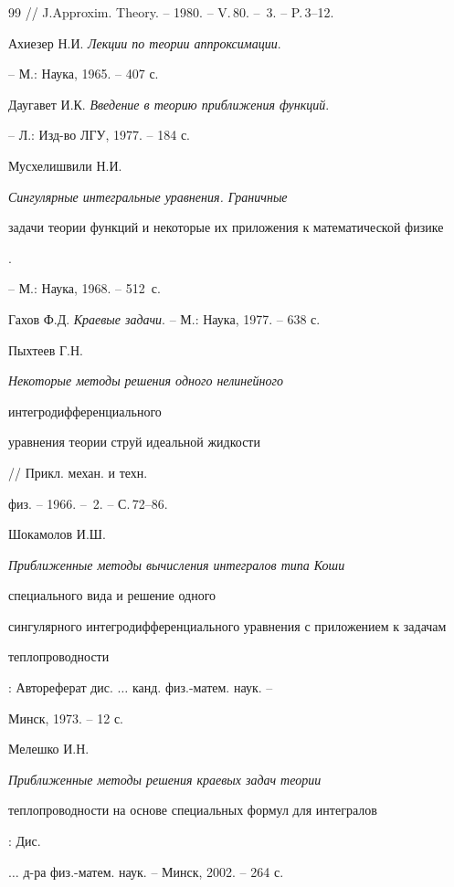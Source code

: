 \begin{thebibliography}{99}
// J.Approxim. Theory. -- 1980. -- V.\,80. -- \No\,3. -- P.\,3--12.







Ахиезер Н.И. {\em Лекции по теории аппроксимации}.


-- М.: Наука, 1965. -- 407 с.







Даугавет И.К. {\em Введение в теорию приближения функций}.


-- Л.: Изд-во ЛГУ, 1977. -- 184 с.







Мусхелишвили Н.И. {\em Сингулярные интегральные уравнения. Граничные


задачи теории функций и некоторые их приложения к математической физике}.


-- М.: Наука, 1968. -- 512~с.







Гахов Ф.Д. {\em Краевые задачи}. -- М.: Наука, 1977. -- 638 с.







Пыхтеев Г.Н. {\em Некоторые методы решения одного нелинейного


интегродифференциального


уравнения теории струй идеальной жидкости} // Прикл. механ. и техн.


физ. -- 1966. -- \No\,2. -- С.\,72--86.







Шокамолов И.Ш. {\em Приближенные методы вычисления интегралов типа Коши


специального вида и решение одного


сингулярного интегродифференциального уравнения с приложением к задачам


теплопроводности}: Автореферат дис. $\dotsc$ канд. физ.-матем. наук. --


Минск, 1973. -- 12 с.







Мелешко И.Н. {\em Приближенные методы решения краевых задач теории


теплопроводности на основе специальных формул для интегралов}: Дис. 


$\dotsc$ д-ра физ.-матем. наук. -- Минск, 2002. -- 264 с.





\end{thebibliography}






